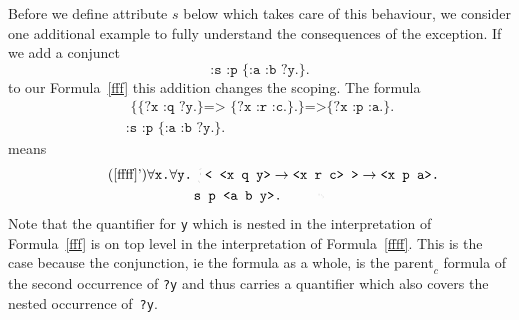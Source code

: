 Before we define attribute $s$ below which takes care of this behaviour, we consider one additional example to fully understand the consequences of the exception.
If we add a conjunct 
\[
 \texttt{:s :p \{:a :b ?y.\}.}
\]
to our Formula~\ref{fff} this addition changes the scoping. The formula
\begin{multline}\label{ffff}
\texttt{ \{\{?x :q ?y.\} => \{?x :r :c.\}.\}=>}
\texttt{\{?x :p :a.\}.}\\
 \texttt{:s :p \{:a :b ?y.\}.}
\end{multline}
means
 \begin{multline}\tag{\ref{ffff}'} \label{ffff'}
   \forall \texttt{x.}\forall \texttt{y.}\lhexbrace
  \texttt{< <x q y>} \rightarrow \texttt{<x r c> >}\rightarrow  \texttt{<x p a>.}\\
  \texttt{s p <a b y>.\rhexbrace
  }
 \end{multline}
Note that the quantifier for \texttt{y} which is nested in the interpretation of Formula~\ref{fff} is on top level in the interpretation of Formula~\ref{ffff}. 
This is the case because the conjunction, ie the formula as a whole, is the $\text{parent}_c$ formula of the second occurrence of \texttt{?y} and thus carries a quantifier which 
also covers the nested occurrence of~\texttt{?y}.

